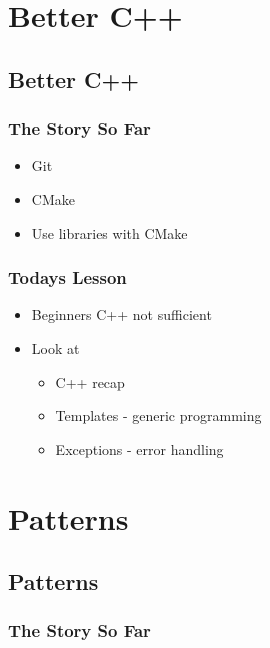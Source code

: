 \section{Better C++}\label{better-c}

\subsection{Better C++}\label{better-c-1}

\subsubsection{The Story So Far}\label{the-story-so-far}

\begin{itemize}
\itemsep1pt\parskip0pt
\item
  Git
\item
  CMake
\item
  Use libraries with CMake
\end{itemize}

\subsubsection{Todays Lesson}\label{todays-lesson-1}

\begin{itemize}
\itemsep1pt\parskip0pt
\item
  Beginners C++ not sufficient
\item
  Look at

  \begin{itemize}
  \itemsep1pt\parskip0pt
  \item
    C++ recap
  \item
    Templates - generic programming
  \item
    Exceptions - error handling
  \end{itemize}
\end{itemize}

\section{Patterns}\label{patterns}

\subsection{Patterns}\label{patterns-1}

\subsubsection{The Story So Far}\label{the-story-so-far-1}

